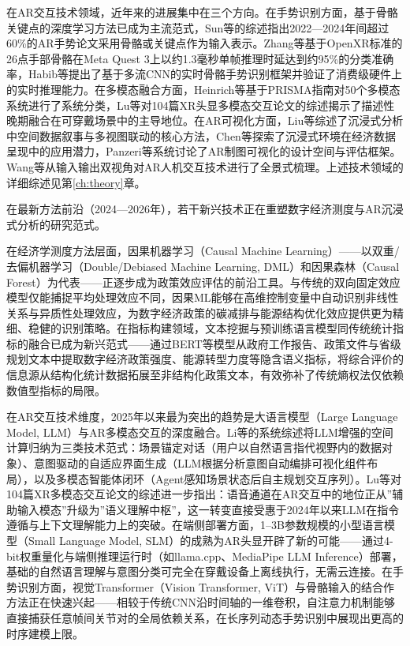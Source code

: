 在AR交互技术领域，近年来的进展集中在三个方向。在手势识别方面，基于骨骼关键点的深度学习方法已成为主流范式，Sun等的综述指出2022—2024年间超过60\%的AR手势论文采用骨骼或关键点作为输入表示\cite{sun2024ar_gesture_survey}。Zhang等基于OpenXR标准的26点手部骨骼在Meta Quest 3上以约1.3毫秒单帧推理时延达到约95\%的分类准确率\cite{openxr2025gesture}，Habib等提出了基于多流CNN的实时骨骼手势识别框架并验证了消费级硬件上的实时推理能力\cite{habib2025skeleton_hgr}。在多模态融合方面，Heinrich等基于PRISMA指南对50个多模态系统进行了系统分类\cite{heinrich2025fusion_survey}，Lu等对104篇XR头显多模态交互论文的综述揭示了描述性晚期融合在可穿戴场景中的主导地位\cite{lu2025spatial_computing}。在AR可视化方面，Liu等综述了沉浸式分析中空间数据叙事与多视图联动的核心方法\cite{Liu_Jia_Nie_Rosenberg_Interrante_Zhu-Tian_2025}，Chen等探索了沉浸式环境在经济数据呈现中的应用潜力\cite{chen2025immersive_econ}，Panzeri等系统讨论了AR制图可视化的设计空间与评估框架\cite{panzeri2026cartographic}。Wang等从输入输出双视角对AR人机交互技术进行了全景式梳理\cite{wang2026ar_io_survey}。上述技术领域的详细综述见第\ref{ch:theory}章。

在最新方法前沿（2024—2026年），若干新兴技术正在重塑数字经济测度与AR沉浸式分析的研究范式。

在经济学测度方法层面，因果机器学习（Causal Machine Learning）——以双重/去偏机器学习（Double/Debiased Machine Learning, DML）\cite{chernozhukov2018doubleml}和因果森林（Causal Forest）\cite{athey2019causalforest}为代表——正逐步成为政策效应评估的前沿工具。与传统的双向固定效应模型仅能捕捉平均处理效应不同，因果ML能够在高维控制变量中自动识别非线性关系与异质性处理效应，为数字经济政策的碳减排与能源结构优化效应提供更为精细、稳健的识别策略。在指标构建领域，文本挖掘与预训练语言模型同传统统计指标的融合已成为新兴范式——通过BERT等模型从政府工作报告、政策文件与省级规划文本中提取数字经济政策强度、能源转型力度等隐含语义指标，将综合评价的信息源从结构化统计数据拓展至非结构化政策文本，有效弥补了传统熵权法仅依赖数值型指标的局限。

在AR交互技术维度，2025年以来最为突出的趋势是大语言模型（Large Language Model, LLM）与AR多模态交互的深度融合。Li等\cite{li2025llm_ar_fusion}的系统综述将LLM增强的空间计算归纳为三类技术范式：场景锚定对话（用户以自然语言指代视野内的数据对象）、意图驱动的自适应界面生成（LLM根据分析意图自动编排可视化组件布局），以及多模态智能体闭环（Agent感知场景状态后自主规划交互序列）。Lu等\cite{lu2025spatial_computing}对104篇XR多模态交互论文的综述进一步指出：语音通道在AR交互中的地位正从”辅助输入模态”升级为”语义理解中枢”，这一转变直接受惠于2024年以来LLM在指令遵循与上下文理解能力上的突破。在端侧部署方面，1--3B参数规模的小型语言模型（Small Language Model, SLM）的成熟为AR头显开辟了新的可能——通过4-bit权重量化与端侧推理运行时（如llama.cpp、MediaPipe LLM Inference）部署，基础的自然语言理解与意图分类可完全在穿戴设备上离线执行，无需云连接\cite{fertl2025hgr_edge_survey}。在手势识别方面，视觉Transformer（Vision Transformer, ViT）与骨骼输入的结合作方法正在快速兴起——相较于传统CNN沿时间轴的一维卷积，自注意力机制能够直接捕获任意帧间关节对的全局依赖关系，在长序列动态手势识别中展现出更高的时序建模上限。

